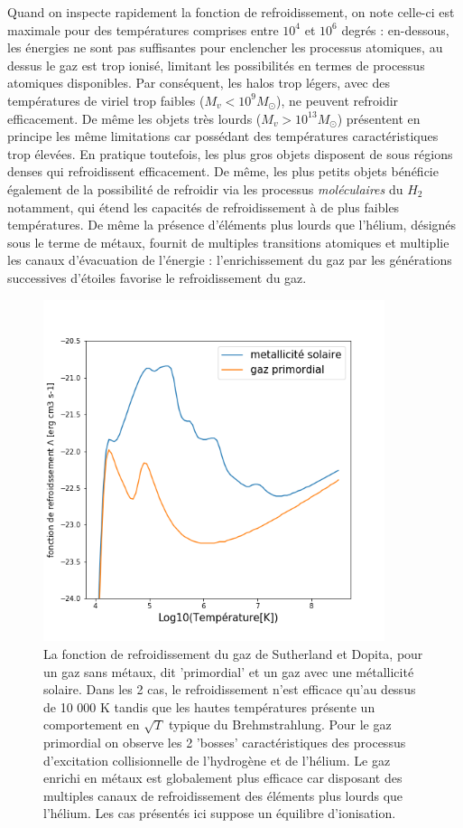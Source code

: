 Quand on inspecte rapidement la fonction de refroidissement, on note celle-ci est maximale pour des températures comprises entre $10^4$ et $10^6$ degrés : en-dessous, les énergies ne sont pas suffisantes pour enclencher les processus atomiques, au dessus le gaz est trop ionisé, limitant les possibilités en termes de processus atomiques disponibles. Par conséquent, les halos trop légers, avec des températures de viriel trop faibles ($M_v<10^9 M_\odot$), ne peuvent refroidir efficacement. De même les objets très lourds ($M_v>10^{13} M_\odot$) présentent en principe les même limitations car possédant des températures caractéristiques trop élevées. En pratique toutefois, les plus gros objets disposent de sous régions denses qui refroidissent efficacement. De même, les plus petits objets bénéficie également de la possibilité de refroidir via les processus \textit{moléculaires} du $H_2$ notamment, qui étend les capacités de refroidissement à de plus faibles températures. De même la présence d'éléments plus lourds que l'hélium, désignés sous le terme de métaux, fournit de multiples transitions atomiques et multiplie les canaux d'évacuation de l'énergie : l'enrichissement du gaz par les générations successives d'étoiles favorise le refroidissement du gaz.

\begin{figure}[htbp]
	\centering
		\includegraphics[height=10cm]{figs/cool.png}
		\caption[La fonction de refroidissement du gaz]{La fonction de refroidissement du gaz de Sutherland et Dopita, pour un gaz sans métaux, dit 'primordial' et un gaz avec une métallicité solaire. Dans les 2 cas, le refroidissement n'est efficace qu'au dessus de 10 000 K tandis que les hautes températures présente un comportement en $\sqrt{T}$ typique du Brehmstrahlung. Pour le gaz primordial on observe les 2 'bosses' caractéristiques des processus d'excitation collisionnelle de l'hydrogène et de l'hélium. Le gaz enrichi en métaux est globalement plus efficace car disposant des multiples canaux de refroidissement des éléments plus lourds que l'hélium. Les cas présentés ici suppose un équilibre d'ionisation.}
	\label{f:coolins}
\end{figure}


